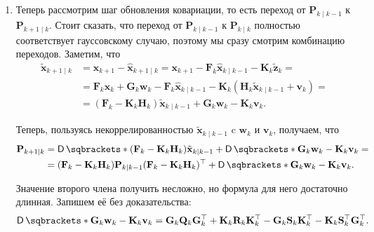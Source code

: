 \begin{enumerate}
	\item Теперь рассмотрим шаг обновления ковариации, то есть переход от 
	\(\mathbf{P}_{k \mid k - 1}\) к \(\mathbf{P}_{k + 1 \mid k}\). Стоит 
	сказать, что переход от \(\mathbf{P}_{k \mid k - 1}\) к \(\mathbf{P}_{k 
	\mid k}\) полностью соответствует гауссовскому случаю, поэтому мы сразу 
	смотрим комбинацию переходов. Заметим, что
	\begin{align*}
		\tilde{\mathbf{x}}_{k + 1 \mid k} &= \mathbf{x}_{k + 1} - 
		\hat{\mathbf{x}}_{k + 1 \mid k} = \mathbf{x}_{k + 1} - 
		\mathbf{F}_{k}\hat{\mathbf{x}}_{k \mid k - 1} - 
		\mathbf{K}_{k}\tilde{\mathbf{z}}_{k} = \\ 
		&= \mathbf{F}_{k}\mathbf{x}_{k} + \mathbf{G}_{k}\mathbf{w}_{k} - 
		\mathbf{F}_{k}\hat{\mathbf{x}}_{k \mid k - 1} - \mathbf{K}_{k} 
		(\mathbf{H}_{k} \tilde{\mathbf{x}}_{k \mid k - 1} + \mathbf{v}_{k}) = \\
		&= (\mathbf{F}_{k} - \mathbf{K}_{k}\mathbf{H}_{k})\tilde{\mathbf{x}}_{k 
		\mid k - 1} + \mathbf{G}_{k}\mathbf{w}_{k} - \mathbf{K}_{k} 
		\mathbf{v}_{k}.
	\end{align*}
	
	Теперь, пользуясь некоррелированностью \(\tilde{\mathbf{x}}_{k \mid k - 
	1}\) c \(\mathbf{w}_{k}\) и \(\mathbf{v}_{k}\), получаем, что
	\begin{align*}
		\mathbf{P}_{k + 1 \mid k} &= \D{(\mathbf{F}_{k} - \mathbf{K}_{k} 
		\mathbf{H}_{k})\tilde{\mathbf{x}}_{k \mid k - 1}} + \D{\mathbf{G}_{k} 
		\mathbf{w}_{k} - \mathbf{K}_{k}\mathbf{v}_{k}} = \\
		&= (\mathbf{F}_{k} - \mathbf{K}_{k}\mathbf{H}_{k})\mathbf{P}_{k \mid k 
		- 1}(\mathbf{F}_{k} - \mathbf{K}_{k}\mathbf{H}_{k})^{\top} + 
		\D{\mathbf{G}_{k} \mathbf{w}_{k} - \mathbf{K}_{k}\mathbf{v}_{k}}.
	\end{align*}
	
	Значение второго члена получить несложно, но формула для него достаточно 
	длинная. Запишем её без доказательства:
	\[
		\D{\mathbf{G}_{k} \mathbf{w}_{k} - \mathbf{K}_{k}\mathbf{v}_{k}} = 
		\mathbf{G}_{k}\mathbf{Q}_{k}\mathbf{G}_{k}^{\top} + 
		\mathbf{K}_{k}\mathbf{R}_{k}\mathbf{K}_{k}^{\top} - 
		\mathbf{G}_{k}\mathbf{S}_{k}\mathbf{K}_{k}^{\top} - 
		\mathbf{K}_{k}\mathbf{S}_{k}^{\top}\mathbf{G}_{k}^{\top}.
	\]
\end{enumerate}

